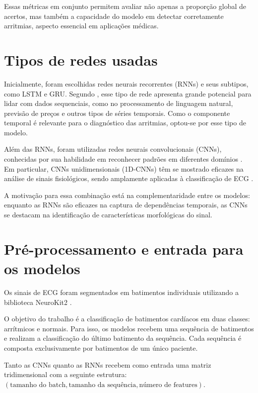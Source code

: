 \documentclass[
    12pt,                %
    openright,           %
    oneside,             %
    a4paper,             %
    brazil               %
]{abntex2}
\begin{document}
Essas métricas em conjunto permitem avaliar não apenas a proporção global de acertos, mas também a capacidade do modelo em detectar corretamente arritmias, aspecto essencial em aplicações médicas.

\section{Tipos de redes usadas}
\label{sec:tipo_redes}

Inicialmente, foram escolhidas redes neurais recorrentes (RNNs) e seus subtipos, como LSTM e GRU. Segundo , esse tipo de rede apresenta grande potencial para lidar com dados sequenciais, como no processamento de linguagem natural, previsão de preços e outros tipos de séries temporais. Como o componente temporal é relevante para o diagnóstico das arritmias, optou-se por esse tipo de modelo.

Além das RNNs, foram utilizadas redes neurais convolucionais (CNNs), conhecidas por sua habilidade em reconhecer padrões em diferentes domínios . Em particular, CNNs unidimensionais (1D-CNNs) têm se mostrado eficazes na análise de sinais fisiológicos, sendo amplamente aplicadas à classificação de ECG \cite{narotamo2024}.

A motivação para essa combinação está na complementaridade entre os modelos: enquanto as RNNs são eficazes na captura de dependências temporais, as CNNs se destacam na identificação de características morfológicas do sinal.

\section{Pré-processamento e entrada para os modelos}
\label{sec:pre_process}

Os sinais de ECG foram segmentados em batimentos individuais utilizando a biblioteca NeuroKit2 \cite{makowski2021neurokit}.

O objetivo do trabalho é a classificação de batimentos cardíacos em duas classes: arrítmicos e normais. Para isso, os modelos recebem uma sequência de batimentos e realizam a classificação do último batimento da sequência. Cada sequência é composta exclusivamente por batimentos de um único paciente.

Tanto as CNNs quanto as RNNs recebem como entrada uma matriz tridimensional com a seguinte estrutura: $(\text{tamanho do batch}, \text{tamanho da sequência}, \text{número de features})$.
\end{document}
